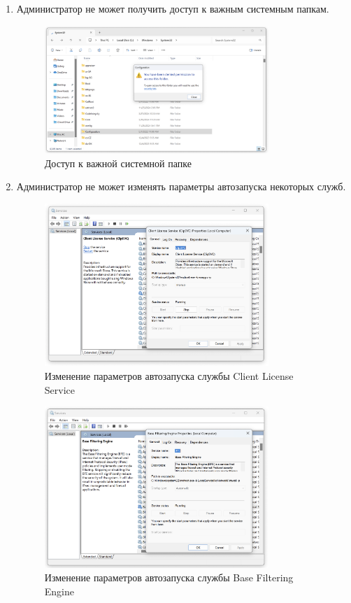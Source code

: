 \documentclass[a4paper, 14pt]{report}
\begin{document}
\begin{enumerate}
    \item Администратор не может получить доступ к важным системным папкам.
          \begin{figure}[H]
              \centering
              \includegraphics[width=0.8\textwidth]{../images/access_system_folders.png}
              \caption{Доступ к важной системной папке}
          \end{figure}
    \item Администратор не может изменять параметры автозапуска некоторых служб.
          \begin{figure}[H]
              \centering
              \includegraphics[width=0.8\textwidth]{../images/startup_client_license.png}
              \caption{Изменение параметров автозапуска службы Client License Service}
          \end{figure}
          \begin{figure}[H]
              \centering
              \includegraphics[width=0.8\textwidth]{../images/startup_bfe.png}
              \caption{Изменение параметров автозапуска службы Base Filtering Engine}
          \end{figure}
\end{enumerate}
\end{document}
